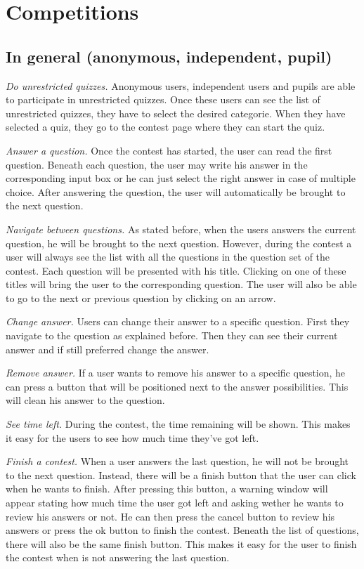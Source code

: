 \section*{Competitions}

\subsection*{In general (anonymous, independent, pupil)}

\textit{Do unrestricted quizzes.}
Anonymous users, independent users and pupils are able to participate in unrestricted quizzes. Once these users can see the list of unrestricted quizzes, they have to select the desired categorie. When they have selected a quiz, they go to the contest page where they can start the quiz. 

\textit{Answer a question.} 
Once the contest has started, the user can read the first question. Beneath each question, the user may write his answer in the corresponding input box or he can just select the right answer in case of multiple choice. After answering the question, the user will automatically be brought to the next question. 

\textit{Navigate between questions.} 
As stated before, when the users answers the current question, he will be brought to the next question. However, during the contest a user will always see the list with all the questions in the question set of the contest. Each question will be presented with his title. Clicking on one of these titles will bring the user to the corresponding question. The user will also be able to go to the next or previous question by clicking on an arrow. 

\textit{Change answer.} 
Users can change their answer to a specific question. First they navigate to the question as explained before. Then they can see their current answer and if still preferred change the answer. 

\textit{Remove answer.} 
If a user wants to remove his answer to a specific question, he can press a button that will be positioned next to the answer possibilities. This will clean his answer to the question. 

\textit{See time left.} 
During the contest, the time remaining will be shown. This makes it easy for the users to see how much time they've got left. 

\textit{Finish a contest.} 
When a user answers the last question, he will not be brought to the next question. Instead, there will be a finish button that the user can click when he wants to finish. After pressing this button, a warning window will appear stating how much time the user got left and asking wether he wants to review his answers or not. He can then press the cancel button to review his answers or press the ok button to finish the contest. Beneath the list of questions, there will also be the same finish button. This makes it easy for the user to finish the contest when is not answering the last question. 

